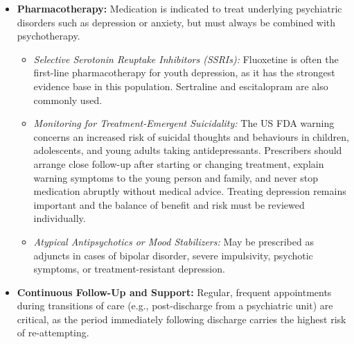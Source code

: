 \begin{itemize}
\begin{itemize}
        \item \textit{Family-Based Therapies:} Interventions such as Attachment-Based Family Therapy (ABFT) aim to repair trust, improve parent-child communication, and resolve family conflicts that contribute to the youth's distress.
    \end{itemize}
    \item \textbf{Pharmacotherapy:} Medication is indicated to treat underlying psychiatric disorders such as depression or anxiety, but must always be combined with psychotherapy.
    \begin{itemize}
        \item \textit{Selective Serotonin Reuptake Inhibitors (SSRIs):} Fluoxetine is often the first-line pharmacotherapy for youth depression, as it has the strongest evidence base in this population. Sertraline and escitalopram are also commonly used.
        \item \textit{Monitoring for Treatment-Emergent Suicidality:} The US FDA warning concerns an increased risk of suicidal thoughts and behaviours in children, adolescents, and young adults taking antidepressants. Prescribers should arrange close follow-up after starting or changing treatment, explain warning symptoms to the young person and family, and never stop medication abruptly without medical advice. Treating depression remains important and the balance of benefit and risk must be reviewed individually.
        \item \textit{Atypical Antipsychotics or Mood Stabilizers:} May be prescribed as adjuncts in cases of bipolar disorder, severe impulsivity, psychotic symptoms, or treatment-resistant depression.
    \end{itemize}
    \item \textbf{Continuous Follow-Up and Support:} Regular, frequent appointments during transitions of care (e.g., post-discharge from a psychiatric unit) are critical, as the period immediately following discharge carries the highest risk of re-attempting.
\end{itemize}

